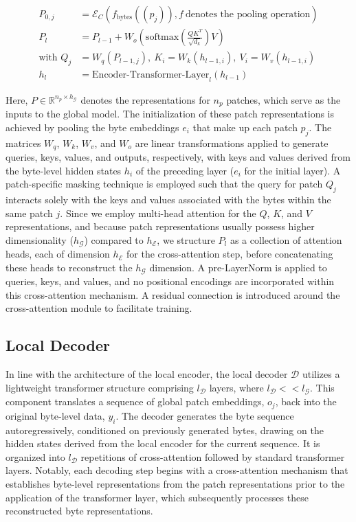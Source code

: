\begin{align}
P_{0,j} &= \mathcal{E}_{C}(f_\text{bytes}((p_j)), f~ \text{denotes the pooling operation}) \\
P_l &= P_{l-1} + W_o\left(\text{softmax}\left(\frac{QK^T}{\sqrt{d_k}}\right)V\right) \\
\text{with } Q_j &= W_q(P_{l-1,j}),~ K_i = W_k(h_{l-1,i}),~ V_i = W_v(h_{l-1,i}) \\
h_l &= \text{Encoder-Transformer-Layer}_l(h_{l-1})
\end{align}

Here, $P \in \mathbb{R}^{n_p \times h_{\mathcal{G}}}$ denotes the representations for $n_p$ patches, which serve as the inputs to the global model. The initialization of these patch representations is achieved by pooling the byte embeddings $e_i$ that make up each patch $p_j$. The matrices $W_q$, $W_k$, $W_v$, and $W_o$ are linear transformations applied to generate queries, keys, values, and outputs, respectively, with keys and values derived from the byte-level hidden states $h_i$ of the preceding layer ($e_i$ for the initial layer). A patch-specific masking technique is employed such that the query for patch $Q_j$ interacts solely with the keys and values associated with the bytes within the same patch $j$. Since we employ multi-head attention for the $Q$, $K$, and $V$ representations, and because patch representations usually possess higher dimensionality ($h_{\mathcal{G}}$) compared to $h_{\mathcal{E}}$, we structure $P_l$ as a collection of attention heads, each of dimension $h_{\mathcal{E}}$ for the cross-attention step, before concatenating these heads to reconstruct the $h_{\mathcal{G}}$ dimension. A pre-LayerNorm is applied to queries, keys, and values, and no positional encodings are incorporated within this cross-attention mechanism. A residual connection is introduced around the cross-attention module to facilitate training.

\subsection{Local Decoder} 

In line with the architecture of the local encoder, the local decoder $\mathcal{D}$ utilizes a lightweight transformer structure comprising $l_{\mathcal{D}}$ layers, where $l_{\mathcal{D}} << l_{\mathcal{G}}$. This component translates a sequence of global patch embeddings, $o_j$, back into the original byte-level data, $y_i$. The decoder generates the byte sequence autoregressively, conditioned on previously generated bytes, drawing on the hidden states derived from the local encoder for the current sequence. It is organized into $l_{\mathcal{D}}$ repetitions of cross-attention followed by standard transformer layers. Notably, each decoding step begins with a cross-attention mechanism that establishes byte-level representations from the patch representations prior to the application of the transformer layer, which subsequently processes these reconstructed byte representations.

